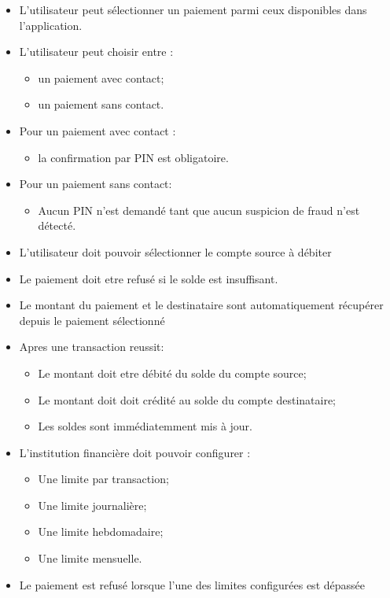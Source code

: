 \begin{itemize}
\tightlist
\item
  L'utilisateur peut sélectionner un paiement parmi ceux disponibles
  dans l'application.
\item
  L'utilisateur peut choisir entre :

  \begin{itemize}
  \tightlist
  \item
    un paiement avec contact;
  \item
    un paiement sans contact.
  \end{itemize}
\item
  Pour un paiement avec contact :

  \begin{itemize}
  \tightlist
  \item
    la confirmation par PIN est obligatoire.
  \end{itemize}
\item
  Pour un paiement sans contact:

  \begin{itemize}
  \tightlist
  \item
    Aucun PIN n'est demandé tant que aucun suspicion de fraud n'est
    détecté.
  \end{itemize}
\item
  L'utilisateur doit pouvoir sélectionner le compte source à débiter
\item
  Le paiement doit etre refusé si le solde est insuffisant.
\item
  Le montant du paiement et le destinataire sont automatiquement
  récupérer depuis le paiement sélectionné
\item
  Apres une transaction reussit:

  \begin{itemize}
  \tightlist
  \item
    Le montant doit etre débité du solde du compte source;
  \item
    Le montant doit doit crédité au solde du compte destinataire;
  \item
    Les soldes sont immédiatemment mis à jour.
  \end{itemize}
\item
  L'institution financière doit pouvoir configurer :

  \begin{itemize}
  \tightlist
  \item
    Une limite par transaction;
  \item
    Une limite journalière;
  \item
    Une limite hebdomadaire;
  \item
    Une limite mensuelle.
  \end{itemize}
\item
  Le paiement est refusé lorsque l'une des limites configurées est
  dépassée
\end{itemize}

